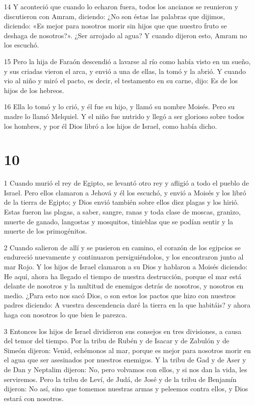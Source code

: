 \par 14 Y aconteció que cuando lo echaron fuera, todos los ancianos se reunieron y discutieron con Amram, diciendo: ¿No son éstas las palabras que dijimos, diciendo: «Es mejor para nosotros morir sin hijos que que nuestro fruto se deshaga de nosotros?». ¿Ser arrojado al agua? Y cuando dijeron esto, Amram no los escuchó.

\par 15 Pero la hija de Faraón descendió a lavarse al río como había visto en un sueño, y sus criadas vieron el arca, y envió a una de ellas, la tomó y la abrió. Y cuando vio al niño y miró el pacto, es decir, el testamento en su carne, dijo: Es de los hijos de los hebreos.

\par 16 Ella lo tomó y lo crió, y él fue su hijo, y llamó su nombre Moisés. Pero su madre lo llamó Melquiel. Y el niño fue nutrido y llegó a ser glorioso sobre todos los hombres, y por él Dios libró a los hijos de Israel, como había dicho.

\chapter{10}

\par 1 Cuando murió el rey de Egipto, se levantó otro rey y afligió a todo el pueblo de Israel. Pero ellos clamaron a Jehová y él los escuchó, y envió a Moisés y los libró de la tierra de Egipto; y Dios envió también sobre ellos diez plagas y los hirió. Estas fueron las plagas, a saber, sangre, ranas y toda clase de moscas, granizo, muerte de ganado, langostas y mosquitos, tinieblas que se podían sentir y la muerte de los primogénitos.

\par 2 Cuando salieron de allí y se pusieron en camino, el corazón de los egipcios se endureció nuevamente y continuaron persiguiéndolos, y los encontraron junto al mar Rojo. Y los hijos de Israel clamaron a su Dios y hablaron a Moisés diciendo: He aquí, ahora ha llegado el tiempo de nuestra destrucción, porque el mar está delante de nosotros y la multitud de enemigos detrás de nosotros, y nosotros en medio. ¿Para esto nos sacó Dios, o son estos los pactos que hizo con nuestros padres diciendo: A vuestra descendencia daré la tierra en la que habitáis? y ahora haga con nosotros lo que bien le parezca.

\par 3 Entonces los hijos de Israel dividieron sus consejos en tres divisiones, a causa del temor del tiempo. Por la tribu de Rubén y de Isacar y de Zabulón y de Simeón dijeron: Venid, echémonos al mar, porque es mejor para nosotros morir en el agua que ser asesinados por nuestros enemigos. Y la tribu de Gad y de Aser y de Dan y Neptalim dijeron: No, pero volvamos con ellos, y si nos dan la vida, les serviremos. Pero la tribu de Leví, de Judá, de José y de la tribu de Benjamín dijeron: No así, sino que tomemos nuestras armas y peleemos contra ellos, y Dios estará con nosotros.

